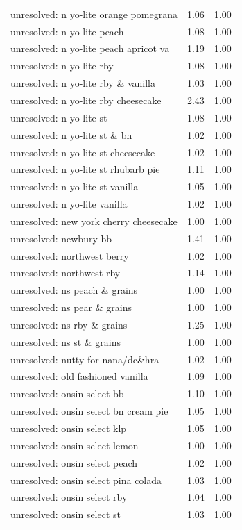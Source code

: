 \begin{table}
\begin{tabular}{lrr}
unresolved: n yo-lite orange pomegrana & 1.06 & 1.00 \\
unresolved: n yo-lite peach & 1.08 & 1.00 \\
unresolved: n yo-lite peach apricot va & 1.19 & 1.00 \\
unresolved: n yo-lite rby & 1.08 & 1.00 \\
unresolved: n yo-lite rby \& vanilla & 1.03 & 1.00 \\
unresolved: n yo-lite rby cheesecake & 2.43 & 1.00 \\
unresolved: n yo-lite st & 1.08 & 1.00 \\
unresolved: n yo-lite st \& bn & 1.02 & 1.00 \\
unresolved: n yo-lite st cheesecake & 1.02 & 1.00 \\
unresolved: n yo-lite st rhubarb pie & 1.11 & 1.00 \\
unresolved: n yo-lite st vanilla & 1.05 & 1.00 \\
unresolved: n yo-lite vanilla & 1.02 & 1.00 \\
unresolved: new york cherry cheesecake & 1.00 & 1.00 \\
unresolved: newbury bb & 1.41 & 1.00 \\
unresolved: northwest berry & 1.02 & 1.00 \\
unresolved: northwest rby & 1.14 & 1.00 \\
unresolved: ns peach \& grains & 1.00 & 1.00 \\
unresolved: ns pear \& grains & 1.00 & 1.00 \\
unresolved: ns rby \& grains & 1.25 & 1.00 \\
unresolved: ns st \& grains & 1.00 & 1.00 \\
unresolved: nutty for nana/dc\&hra & 1.02 & 1.00 \\
unresolved: old fashioned vanilla & 1.09 & 1.00 \\
unresolved: onsin select bb & 1.10 & 1.00 \\
unresolved: onsin select bn cream pie & 1.05 & 1.00 \\
unresolved: onsin select klp & 1.05 & 1.00 \\
unresolved: onsin select lemon & 1.00 & 1.00 \\
unresolved: onsin select peach & 1.02 & 1.00 \\
unresolved: onsin select pina colada & 1.03 & 1.00 \\
unresolved: onsin select rby & 1.04 & 1.00 \\
unresolved: onsin select st & 1.03 & 1.00 \\

\end{tabular}
\end{table}
